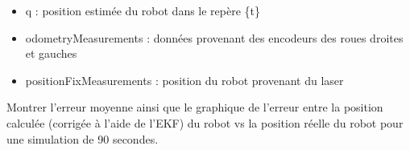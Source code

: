 \documentclass[addpoints]{exam}
\begin{document}
\begin{questions}
\begin{parts}
\begin{itemize}
    \item q : position estimée du robot dans le repère \{t\}
    \item odometryMeasurements : données provenant des encodeurs des roues droites et gauches
    \item positionFixMeasurements : position du robot provenant du laser
\end{itemize}

Montrer l'erreur moyenne ainsi que le graphique de l'erreur entre la position calculée (corrigée à l'aide de l'EKF) du robot vs la position réelle du robot pour une simulation de 90 secondes.

\end{parts}

\begin{solution}
\end{solution}
\end{questions}
\end{document}
